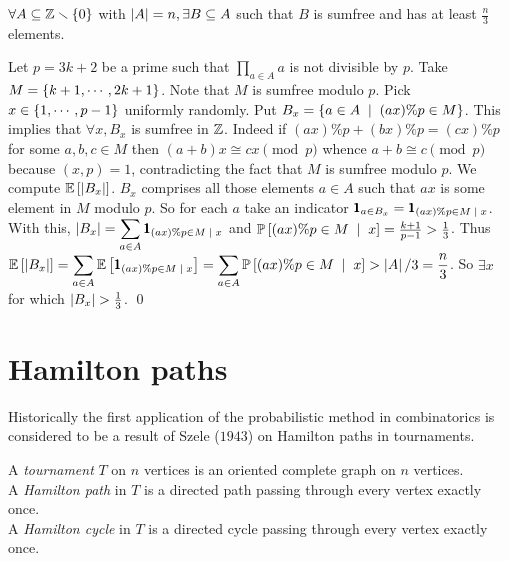 \begin{thm}
$\forall A\subseteq \mathbb{Z}\smallsetminus \left\{0\right\}$ with $\left| A \right|=n, \exists B\subseteq A$ such that $B$ is sumfree and has at least $\frac{n}{3}$ elements.
\end{thm}
\begin{pf}
Let $p=3k+2$ be a prime such that $\prod_{a\in A} a$ is not divisible by $p$. Take $M = \left\{k+1,\cdots,2k+1\right\}$. Note that $M$ is sumfree modulo $p$. Pick $x\in \left\{1,\cdots,p-1\right\}$ uniformly randomly. Put $B_x=\set{a\in A\st (ax)\%p \in M}$. This implies that $\forall x, B_x$ is sumfree in $\mathbb{Z}$. Indeed if $(ax)\%p+(bx)\%p = (cx)\%p$ for some $a,b,c\in M$ then $(a+b)x\cong cx\pmod p$ whence $a+b\cong c\pmod p$ because $(x,p)=1$, contradicting the fact that $M$ is sumfree modulo $p$. We compute $\mathbb E\left[ \left| B_x \right| \right]$. $B_x$ comprises all those elements $a\in A$ such that $ax$ is some element in $M$ modulo $p$. So for each $a$ take an indicator $\pmb 1_{a\in B_x} = \pmb 1_{(ax)\%p\in M\st x}$. With this, $\ds\abs{B_x} = \sum_{a\in A} \pmb 1_{(ax)\%p\in M\st x}$ and $\P{(ax)\%p\in M\st x} = \frac{k+1}{p-1}>\frac{1}{3}$. Thus $\ds\E{\abs{B_x}} = \sum_{a\in A}\E{\pmb 1_{(ax)\%p\in M\st x}} = \sum_{a\in A}\P{(ax)\%p\in M\st x} > \abs A/3 = \frac{n}{3}$. So $\exists x$ for which $\left| B_x \right| > \frac{1}{3}$.
\qed\end{pf}




\section{Hamilton paths}
Historically the first application of the probabilistic method in combinatorics is considered to be a result of Szele ($1943$) on Hamilton paths in tournaments.

\begin{defn}
A \textit{tournament} $T$ on $n$ vertices is an oriented complete graph on $n$ vertices.\\
A \textit{Hamilton path} in $T$ is a directed path passing through every vertex exactly once.\\
A \textit{Hamilton cycle} in $T$ is a directed cycle passing through every vertex exactly once.
\end{defn}

